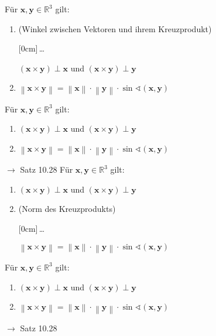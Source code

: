 \documentclass[11pt]{article}
\renewcommand{\cite}[1]{\par\bigskip\hfill{\color{gray}\tiny\(\to\) #1}}
\newcommand{\RR}{\mathbb{R}}
\newcommand*{\norm}[1]{\left\|#1\right\|}
\renewcommand{\vec}[1]{\mathbf{#1}}
\newcommand{\hide}[1]{\parbox{0cm}{\raisebox{-7pt}[0cm]{\dots}}\color{white}#1\color{black}}
\newcommand{\hint}[1]{{\color{lightgray}(#1)}}
\let\olddots\dots
\renewcommand{\dots}{\,\olddots\,}
\newenvironment{field}{}{\newpage}
\newif\ifnote
\newenvironment{note}{\notetrue}{\notefalse}
\newcommand{\localtag}{}
\newcommand{\globaltag}{}
\newcommand{\uuid}{}
\newcommand{\tags}[1]{
    \ifnote
        \renewcommand{\localtag}{#1}
    \else
        \renewcommand{\globaltag}{#1}
    \fi
    }
\newcommand{\xplain}[1]{\renewcommand{\uuid}{#1}}
\begin{document}
\begin{note}
    \tags{Satz}
    \xplain{47c00c10-bdd0-11ec-9d64-0242ac120002}

    \begin{field}
        Für \(\vec{x, y}\in\RR^3\) gilt:
        \begin{enumerate}
            \item \hint{Winkel zwischen Vektoren und ihrem Kreuzprodukt} \hide{\((\vec{x}\times\vec{y})\perp\vec{x}\) und
                  \((\vec{x}\times\vec{y})\perp\vec{y}\)}
            \item \(\norm{\vec{x}\times\vec{y}} =
                    \norm{\vec{x}}\cdot\norm{\vec{y}}
                    \cdot \sin\sphericalangle(\vec{x,y})\)
        \end{enumerate}
    \end{field}
    \begin{field}
        Für \(\vec{x, y}\in\RR^3\) gilt:
        \begin{enumerate}
            \item \((\vec{x}\times\vec{y})\perp\vec{x}\) und
                  \((\vec{x}\times\vec{y})\perp\vec{y}\)
            \item \(\norm{\vec{x}\times\vec{y}} =
                    \norm{\vec{x}}\cdot\norm{\vec{y}}
                    \cdot \sin\sphericalangle(\vec{x,y})\)
        \end{enumerate}
        \cite{Satz 10.28}
    \end{field}
    \begin{field}
        Für \(\vec{x, y}\in\RR^3\) gilt:
        \begin{enumerate}
            \item \((\vec{x}\times\vec{y})\perp\vec{x}\) und
                  \((\vec{x}\times\vec{y})\perp\vec{y}\)
            \item \hint{Norm des Kreuzprodukts} \hide{\(\norm{\vec{x}\times\vec{y}} =
                    \norm{\vec{x}}\cdot\norm{\vec{y}}
                    \cdot \sin\sphericalangle(\vec{x,y})\)}
        \end{enumerate}
    \end{field}
    \begin{field}
        Für \(\vec{x, y}\in\RR^3\) gilt:
        \begin{enumerate}
            \item \((\vec{x}\times\vec{y})\perp\vec{x}\) und
                  \((\vec{x}\times\vec{y})\perp\vec{y}\)
            \item \(\norm{\vec{x}\times\vec{y}} =
                    \norm{\vec{x}}\cdot\norm{\vec{y}}
                    \cdot \sin\sphericalangle(\vec{x,y})\)
        \end{enumerate}
        \cite{Satz 10.28}
    \end{field}
\end{note}

\end{document}
